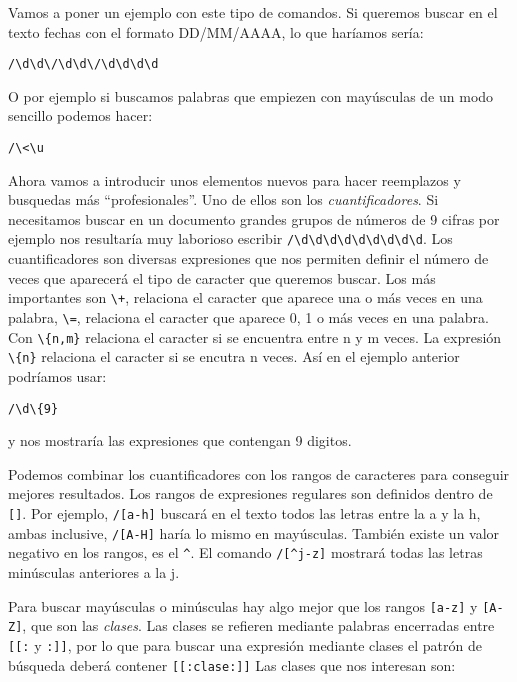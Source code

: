 Vamos a poner un ejemplo con este tipo de comandos. Si queremos buscar
en el texto fechas con el formato DD/MM/AAAA, lo que haríamos sería:

\begin{verbatim}
/\d\d\/\d\d\/\d\d\d\d
\end{verbatim}

O por ejemplo  si buscamos palabras que empiezen con  mayúsculas de un
modo sencillo podemos hacer:

\begin{verbatim}
/\<\u
\end{verbatim}

Ahora vamos a  introducir unos elementos nuevos  para hacer reemplazos
y  busquedas  más  ``profesionales''.  Uno   de  ellos  son  los  {\em
cuantificadores}. Si
necesitamos  buscar   en  un  documento  grandes   grupos  de  números
de  9  cifras  por  ejemplo  nos  resultaría  muy  laborioso  escribir
\verb./\d\d\d\d\d\d\d\d\d..    Los   cuantificadores    son   diversas
expresiones que nos permiten definir  el número de veces que aparecerá
el  tipo de  caracter que  queremos  buscar. Los  más importantes  son
\verb.\+., relaciona  el caracter que aparece  una o más veces  en una
palabra, \verb.\=., relaciona el caracter que aparece 0, 1 o más veces
en  una  palabra.  Con  \verb.\{n,m}.  relaciona  el  caracter  si  se
encuentra entre  n y  m veces. La  expresión \verb.\{n}.  relaciona el
caracter si se  encutra n veces. Así en el  ejemplo anterior podríamos
usar:

\begin{verbatim}
/\d\{9}
\end{verbatim}

y nos mostraría las expresiones que contengan 9 digitos.

Podemos combinar los cuantificadores con los rangos de caracteres para
conseguir mejores resultados. Los  rangos de expresiones regulares son
definidos dentro  de \verb.[].. Por ejemplo,  \verb./[a-h]. buscará en
el  texto  todos las  letras  entre  la a  y  la  h, ambas  inclusive,
\verb./[A-H].  haría  lo  mismo   en  mayúsculas.  También  existe  un
valor  negativo  en los  rangos,  es  el  {\tt \verb.^.}.  El  comando
\verb./[^j-z]. mostrará todas las letras minúsculas anteriores a la j.

Para   buscar   mayúsculas   o   minúsculas   hay   algo   mejor   que
los   rangos   \verb.[a-z].  y   \verb.[A-Z].,   que   son  las   {\em
clases}.   Las   clases   se
refieren mediante  palabras encerradas entre \verb.[[:.  y \verb.:]].,
por  lo  que para  buscar  una  expresión  mediante clases  el  patrón
de  búsqueda deberá  contener  \verb.[[:clase:]]. Las  clases que  nos
interesan son:

